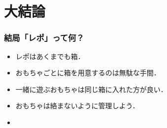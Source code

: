 \section{大結論}

\begin{frame}
    \frametitle{結局「レポ」って何？}
    \begin{itemize}
        \item<2-> レポはあくまでも箱．
        \item<3-> おもちゃごとに箱を用意するのは無駄な手間．
        \item<4-> 一緒に遊ぶおもちゃは同じ箱に入れた方が良い．
        \item<5-> おもちゃは絡まないように管理しよう．
        \item<6-> 
    \end{itemize}
\end{frame}
